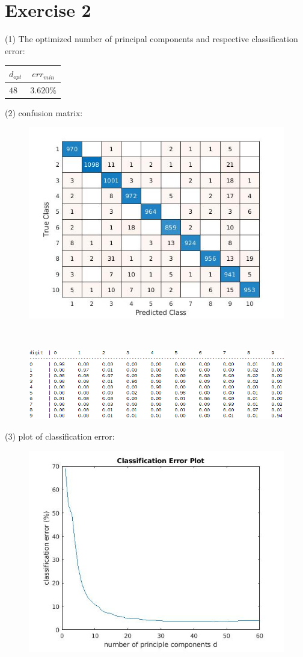 \documentclass{article}
\begin{document}
\section*{Exercise 2}
(1) The optimized number of principal components and respective classification error:
\begin{center}
	\begin{tabular}{ l | c }
		\hline
		$d_{opt}$ & $err_{min}$ \\ \hline		
		$48$ & $3.620\%$ \\ \hline
	\end{tabular}
\end{center}
(2) confusion matrix:
\begin{figure}[ht]
	\centering
	\includegraphics[width=0.7\linewidth]{confusionMat.jpg}  
\end{figure}
\\[8pt]
\begin{figure}[ht]
	\centering
	\includegraphics[width=1\linewidth]{helper.png}  
\end{figure}
\newpage
(3) plot of classification error:
\begin{figure}[ht]
	\centering
	\includegraphics[width=0.8\linewidth]{error.jpg}  
\end{figure}
\end{document}
